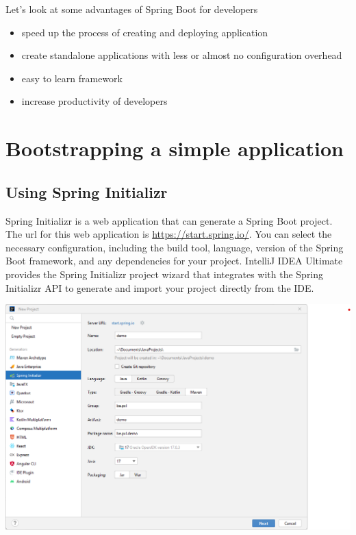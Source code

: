 \documentclass[a4paper, 12pt]{report}
\begin{document}
Let's look at some advantages of Spring Boot for developers 
\begin{itemize}
\item speed up the process of creating and deploying application
\item create standalone applications with less or almost no configuration overhead
\item easy to learn framework
\item increase productivity of developers
\end{itemize}

\section{Bootstrapping a simple application}

\subsection{Using Spring Initializr}
Spring Initializr is a web application that can generate a Spring Boot project.
The url for this web application is \url{https://start.spring.io/}. You can select the necessary configuration, including the build tool, language, version of the Spring Boot framework, and any dependencies for your project. IntelliJ IDEA Ultimate provides the Spring Initializr project wizard that integrates with the Spring Initializr API to generate and import your project directly from the IDE.

\includegraphics[width=\textwidth]{./images/chapter1/spring_initializer_intellij.png}
\end{document}
